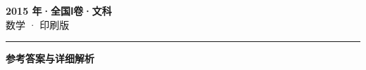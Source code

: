 \documentclass[zihao=5, a4paper]{ctexart}
\begin{document}
\begin{center}
  {\Large\bfseries 2015 年·全国Ⅰ卷·文科}\\[4pt]
  {\large 数学 · 印刷版}
\end{center}
\medskip
{}

\par\bigskip\hrule\bigskip
{}
\begin{center}{\large\bfseries 参考答案与详细解析}\end{center}
\smallskip

\end{document}
